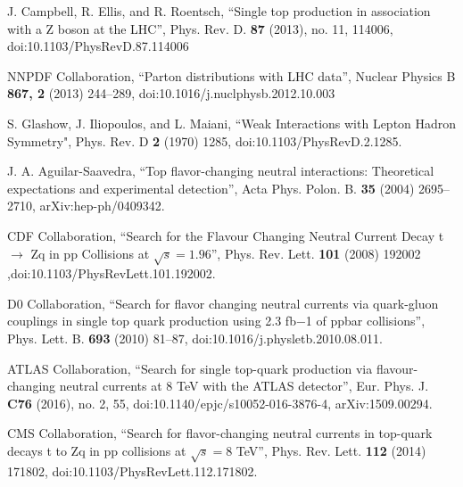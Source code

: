 \documentclass[12pt]{article}
\begin{document}
\begin{thebibliography}{99}




J. Campbell, R. Ellis, and R. Roentsch, \textquotedblleft Single top production in association with a Z boson at the LHC\textquotedblright , Phys. Rev.  D. {\bf 87} (2013), no. 11, 114006, doi:10.1103/PhysRevD.87.114006

NNPDF Collaboration, \textquotedblleft Parton distributions with LHC data\textquotedblright , Nuclear Physics B {\bf 867, 2} (2013) 244–289, doi:10.1016/j.nuclphysb.2012.10.003

S. Glashow, J. Iliopoulos, and L. Maiani, \textquotedblleft Weak Interactions with Lepton Hadron
Symmetry", Phys. Rev. D {\bf 2} (1970) 1285, doi:10.1103/PhysRevD.2.1285.

J. A. Aguilar-Saavedra, \textquotedblleft Top flavor-changing neutral interactions: Theoretical expectations and experimental detection\textquotedblright , Acta Phys. Polon. B. {\bf 35} (2004) 2695–2710, arXiv:hep-ph/0409342.


 CDF Collaboration, \textquotedblleft Search for the Flavour Changing Neutral Current Decay t $\rightarrow$ Zq in  pp Collisions at $\sqrt{s} = 1.96$\textquotedblright , Phys. Rev. Lett.  {\bf 101} (2008) 192002 ,doi:10.1103/PhysRevLett.101.192002.

 D0 Collaboration, \textquotedblleft Search for flavor changing neutral currents via quark-gluon couplings in single top quark production using 2.3 fb−1 of ppbar collisions\textquotedblright , Phys. Lett. B.  {\bf 693} (2010) 81–87, doi:10.1016/j.physletb.2010.08.011.
 
  ATLAS Collaboration, \textquotedblleft Search for single top-quark production via flavour-changing neutral currents at 8 TeV with the ATLAS detector\textquotedblright , Eur. Phys. J.  {\bf C76} (2016), no. 2, 55, doi:10.1140/epjc/s10052-016-3876-4, arXiv:1509.00294.
  





CMS Collaboration, \textquotedblleft Search for flavor-changing neutral currents in top-quark decays t to Zq in pp collisions at  $\sqrt{s} = 8$ TeV\textquotedblright , Phys. Rev. Lett. {\bf 112} (2014) 171802, doi:10.1103/PhysRevLett.112.171802.



\end{thebibliography}
\end{document}
